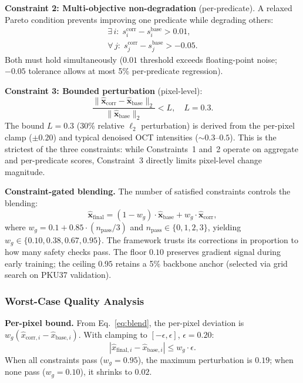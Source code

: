 \documentclass[journal,twoside,web]{ieeecolor}
\begin{document}
\textbf{Constraint 2: Multi-objective non-degradation} (per-predicate). A relaxed Pareto condition prevents improving one predicate while degrading others:
\begin{gather}
\exists\, i:\; s_i^\text{corr} - s_i^\text{base} > 0.01, \label{eq:pareto_improve} \\
\forall\, j:\; s_j^\text{corr} - s_j^\text{base} > -0.05. \label{eq:pareto_nondeg}
\end{gather}
Both must hold simultaneously ($0.01$ threshold exceeds floating-point noise; $-0.05$ tolerance allows at most 5\% per-predicate regression).

\textbf{Constraint 3: Bounded perturbation} (pixel-level):
\begin{equation}
\frac{\|\hat{\mathbf{x}}_\text{corr} - \hat{\mathbf{x}}_\text{base}\|_2}{\|\hat{\mathbf{x}}_\text{base}\|_2} < L, \quad L = 0.3.
\label{eq:bounded_perturbation}
\end{equation}
The bound $L = 0.3$ (30\% relative $\ell_2$ perturbation) is derived from the per-pixel clamp ($\pm 0.20$) and typical denoised OCT intensities (${\sim}0.3$--$0.5$). This is the strictest of the three constraints: while Constraints~1 and~2 operate on aggregate and per-predicate scores, Constraint~3 directly limits pixel-level change magnitude.

\textbf{Constraint-gated blending.} The number of satisfied constraints controls the blending:
\begin{equation}
\hat{\mathbf{x}}_\text{final} = (1 - w_g) \cdot \hat{\mathbf{x}}_\text{base} + w_g \cdot \hat{\mathbf{x}}_\text{corr},
\label{eq:blend}
\end{equation}
where $w_g = 0.1 + 0.85 \cdot (n_\text{pass}/3)$ and $n_\text{pass} \in \{0,1,2,3\}$, yielding $w_g \in \{0.10, 0.38, 0.67, 0.95\}$. The framework trusts its corrections in proportion to how many safety checks pass. The floor $0.10$ preserves gradient signal during early training; the ceiling $0.95$ retains a 5\% backbone anchor (selected via grid search on PKU37 validation).

\subsubsection{Worst-Case Quality Analysis}

\textbf{Per-pixel bound.} From Eq.~\eqref{eq:blend}, the per-pixel deviation is $w_g(\hat{x}_{\mathrm{corr},i} - \hat{x}_{\mathrm{base},i})$. With clamping to $[-\epsilon, \epsilon]$, $\epsilon = 0.20$:
\begin{equation}
|\hat{x}_{\mathrm{final},i} - \hat{x}_{\mathrm{base},i}| \leq w_g \cdot \epsilon.
\label{eq:pixel_bound}
\end{equation}
When all constraints pass ($w_g = 0.95$), the maximum perturbation is $0.19$; when none pass ($w_g = 0.10$), it shrinks to $0.02$.
\end{document}
